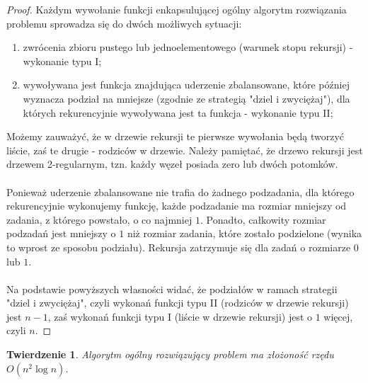 \documentclass[10pt,a4paper]{article}
\newtheorem{theorem}{Twierdzenie}
\begin{document}
	\begin{proof}
		Każdym wywołanie funkcji enkapsulującej ogólny algorytm rozwiązania problemu sprowadza się do dwóch możliwych sytuacji:
		\begin{enumerate}
			\item zwrócenia zbioru pustego lub jednoelementowego (warunek stopu rekursji) - wykonanie typu I;
			\item wywoływana jest funkcja znajdująca uderzenie zbalansowane, które później wyznacza podział na mniejsze (zgodnie ze strategią "dziel i zwyciężaj"), dla których rekurencyjnie wywoływana jest ta funkcja - wykonanie typu II;
		\end{enumerate} 
		Możemy zauważyć, że w drzewie rekursji te pierwsze wywołania będą tworzyć liście, zaś te drugie - rodziców w drzewie. Należy pamiętać, że drzewo rekursji jest drzewem 2-regularnym, tzn. każdy węzeł posiada zero lub dwóch potomków.\\~\\
		Ponieważ uderzenie zbalansowane nie trafia do żadnego podzadania, dla którego rekurencyjnie wykonujemy funkcję, każde podzadanie ma rozmiar mniejszy od zadania, z którego powstało, o co najmniej $1$. Ponadto, całkowity rozmiar podzadań jest mniejszy o $1$ niż rozmiar zadania, które zostało podzielone (wynika to wprost ze sposobu podziału). Rekursja zatrzymuje się dla zadań o rozmiarze $0$ lub $1$.\\~\\
		Na podstawie powyższych własności widać, że podziałów w ramach strategii "dziel i zwyciężaj", czyli wykonań funkcji typu II (rodziców w drzewie rekursji) jest $n - 1$, zaś wykonań funkcji typu I (liście w drzewie rekursji) jest o $1$ więcej, czyli $n$.
	\end{proof}	
	
	\vspace{1em}
	
	\begin{theorem} \label{theorem:3}
		Algorytm ogólny rozwiązujący problem ma złożoność rzędu $O(n^{2} \log n)$.
	\end{theorem}
	
\end{document}
